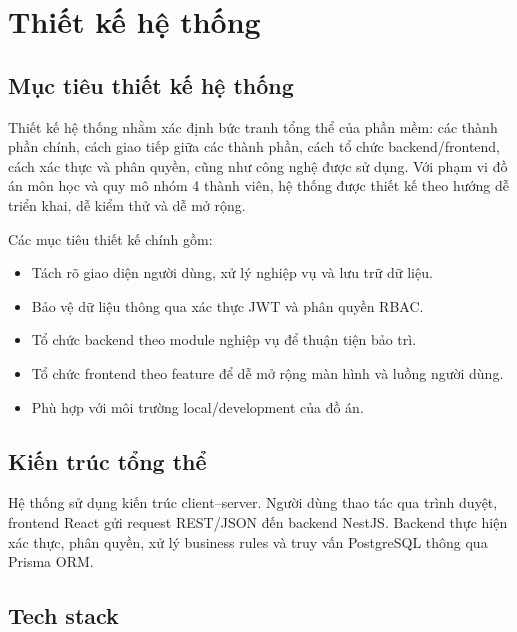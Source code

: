 \chapter{Thiết kế hệ thống}

\section{Mục tiêu thiết kế hệ thống}

Thiết kế hệ thống nhằm xác định bức tranh tổng thể của phần mềm: các thành phần chính, cách giao tiếp giữa các thành phần, cách tổ chức backend/frontend, cách xác thực và phân quyền, cũng như công nghệ được sử dụng. Với phạm vi đồ án môn học và quy mô nhóm 4 thành viên, hệ thống được thiết kế theo hướng dễ triển khai, dễ kiểm thử và dễ mở rộng.

Các mục tiêu thiết kế chính gồm:

\begin{itemize}
    \item Tách rõ giao diện người dùng, xử lý nghiệp vụ và lưu trữ dữ liệu.
    \item Bảo vệ dữ liệu thông qua xác thực JWT và phân quyền RBAC.
    \item Tổ chức backend theo module nghiệp vụ để thuận tiện bảo trì.
    \item Tổ chức frontend theo feature để dễ mở rộng màn hình và luồng người dùng.
    \item Phù hợp với môi trường local/development của đồ án.
\end{itemize}

\section{Kiến trúc tổng thể}

Hệ thống sử dụng kiến trúc client--server. Người dùng thao tác qua trình duyệt, frontend React gửi request REST/JSON đến backend NestJS. Backend thực hiện xác thực, phân quyền, xử lý business rules và truy vấn PostgreSQL thông qua Prisma ORM.



\section{Tech stack}

